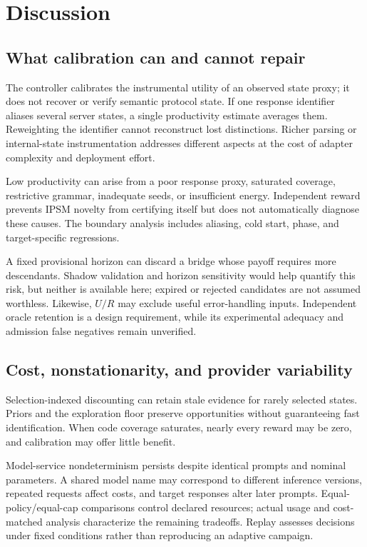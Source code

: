 \documentclass[final,5p,times,number]{elsarticle}
\begin{document}
\section{Discussion}
\subsection{What calibration can and cannot repair}
The controller calibrates the instrumental utility of an observed state proxy; it does not recover or verify semantic protocol state. If one response identifier aliases several server states, a single productivity estimate averages them. Reweighting the identifier cannot reconstruct lost distinctions. Richer parsing or internal-state instrumentation addresses different aspects at the cost of adapter complexity and deployment effort.

Low productivity can arise from a poor response proxy, saturated coverage, restrictive grammar, inadequate seeds, or insufficient energy. Independent reward prevents IPSM novelty from certifying itself but does not automatically diagnose these causes. The boundary analysis includes aliasing, cold start, phase, and target-specific regressions.

A fixed provisional horizon can discard a bridge whose payoff requires more descendants. Shadow validation and horizon sensitivity would help quantify this risk, but neither is available here; expired or rejected candidates are not assumed worthless. Likewise, $U/R$ may exclude useful error-handling inputs. Independent oracle retention is a design requirement, while its experimental adequacy and admission false negatives remain unverified.

\subsection{Cost, nonstationarity, and provider variability}
Selection-indexed discounting can retain stale evidence for rarely selected states. Priors and the exploration floor preserve opportunities without guaranteeing fast identification. When code coverage saturates, nearly every reward may be zero, and calibration may offer little benefit.

Model-service nondeterminism persists despite identical prompts and nominal parameters. A shared model name may correspond to different inference versions, repeated requests affect costs, and target responses alter later prompts. Equal-policy/equal-cap comparisons control declared resources; actual usage and cost-matched analysis characterize the remaining tradeoffs. Replay assesses decisions under fixed conditions rather than reproducing an adaptive campaign.
\end{document}
